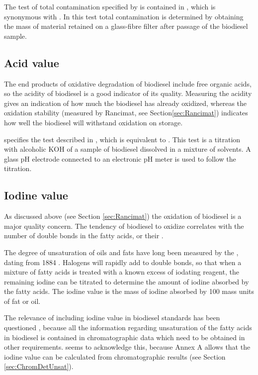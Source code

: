 The test of total contamination specified by  is contained in
, which is synonymous with . In this test total
contamination is determined by obtaining the mass of material retained on a
glass-fibre filter after passage of the biodiesel sample.

\subsection{Acid value}

The end products of oxidative degradation of biodiesel include free organic
acids, so the acidity of biodiesel is a good indicator of its quality. Measuring
the acidity gives an indication of how much the biodiesel has already oxidized,
whereas the oxidation stability (measured by Rancimat, see
Section\ref{sec:Rancimat}) indicates how well the biodiesel will withstand
oxidation on storage.

 specifies the test described in , which is
equivalent to . This test is a titration with alcoholic KOH of a
sample of biodiesel dissolved in a mixture of solvents. A glass pH electrode
connected to an electronic pH meter is used to follow the titration.

\subsection{Iodine value}

As discussed above (see Section \ref{sec:Rancimat}) the oxidation of biodiesel
is a major quality concern. The tendency of biodiesel to oxidize correlates with
the number of double bonds in the fatty acids, or their .


The degree of unsaturation of oils and fats have long been measured by the
, dating from 1884 \autocite{Knothe2007}. Halogens will
rapidly add to double bonds, so that when a mixture of fatty acids is treated
with a known excess of iodating reagent, the remaining iodine can be titrated to
determine the amount of iodine absorbed by the fatty acids. The iodine value is
the mass of iodine absorbed by 100 mass units of fat or oil.

The relevance of including iodine value in biodiesel standards has been
questioned \autocite{Knothe2002}, because all the information regarding
unsaturation of the fatty acids in biodiesel is contained in chromatographic
data which need to be obtained in other requirements.  seems to
acknowledge this, because Annex A allows that the iodine value can be calculated
from chromatographic results (see Section \ref{sec:ChromDetUnsat}).

